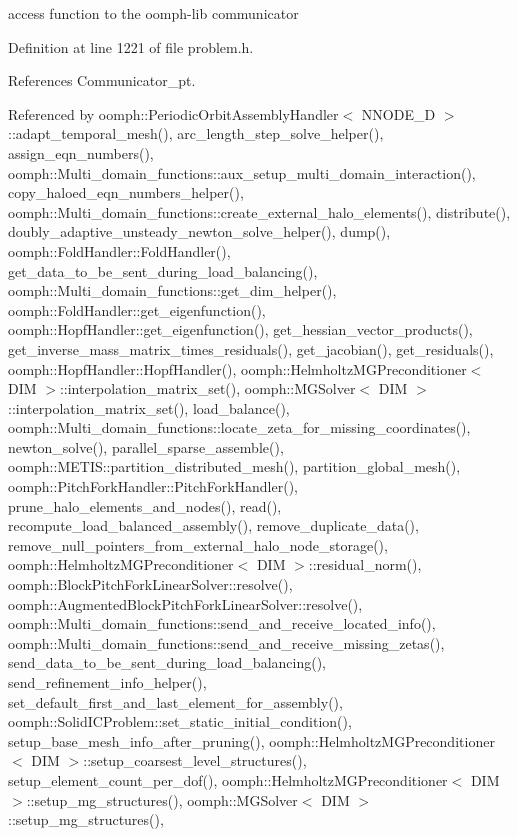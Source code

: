 access function to the oomph-\/lib communicator 



Definition at line 1221 of file problem.\+h.



References Communicator\+\_\+pt.



Referenced by oomph\+::\+Periodic\+Orbit\+Assembly\+Handler$<$ N\+N\+O\+D\+E\+\_\+D $>$\+::adapt\+\_\+temporal\+\_\+mesh(), arc\+\_\+length\+\_\+step\+\_\+solve\+\_\+helper(), assign\+\_\+eqn\+\_\+numbers(), oomph\+::\+Multi\+\_\+domain\+\_\+functions\+::aux\+\_\+setup\+\_\+multi\+\_\+domain\+\_\+interaction(), copy\+\_\+haloed\+\_\+eqn\+\_\+numbers\+\_\+helper(), oomph\+::\+Multi\+\_\+domain\+\_\+functions\+::create\+\_\+external\+\_\+halo\+\_\+elements(), distribute(), doubly\+\_\+adaptive\+\_\+unsteady\+\_\+newton\+\_\+solve\+\_\+helper(), dump(), oomph\+::\+Fold\+Handler\+::\+Fold\+Handler(), get\+\_\+data\+\_\+to\+\_\+be\+\_\+sent\+\_\+during\+\_\+load\+\_\+balancing(), oomph\+::\+Multi\+\_\+domain\+\_\+functions\+::get\+\_\+dim\+\_\+helper(), oomph\+::\+Fold\+Handler\+::get\+\_\+eigenfunction(), oomph\+::\+Hopf\+Handler\+::get\+\_\+eigenfunction(), get\+\_\+hessian\+\_\+vector\+\_\+products(), get\+\_\+inverse\+\_\+mass\+\_\+matrix\+\_\+times\+\_\+residuals(), get\+\_\+jacobian(), get\+\_\+residuals(), oomph\+::\+Hopf\+Handler\+::\+Hopf\+Handler(), oomph\+::\+Helmholtz\+M\+G\+Preconditioner$<$ D\+I\+M $>$\+::interpolation\+\_\+matrix\+\_\+set(), oomph\+::\+M\+G\+Solver$<$ D\+I\+M $>$\+::interpolation\+\_\+matrix\+\_\+set(), load\+\_\+balance(), oomph\+::\+Multi\+\_\+domain\+\_\+functions\+::locate\+\_\+zeta\+\_\+for\+\_\+missing\+\_\+coordinates(), newton\+\_\+solve(), parallel\+\_\+sparse\+\_\+assemble(), oomph\+::\+M\+E\+T\+I\+S\+::partition\+\_\+distributed\+\_\+mesh(), partition\+\_\+global\+\_\+mesh(), oomph\+::\+Pitch\+Fork\+Handler\+::\+Pitch\+Fork\+Handler(), prune\+\_\+halo\+\_\+elements\+\_\+and\+\_\+nodes(), read(), recompute\+\_\+load\+\_\+balanced\+\_\+assembly(), remove\+\_\+duplicate\+\_\+data(), remove\+\_\+null\+\_\+pointers\+\_\+from\+\_\+external\+\_\+halo\+\_\+node\+\_\+storage(), oomph\+::\+Helmholtz\+M\+G\+Preconditioner$<$ D\+I\+M $>$\+::residual\+\_\+norm(), oomph\+::\+Block\+Pitch\+Fork\+Linear\+Solver\+::resolve(), oomph\+::\+Augmented\+Block\+Pitch\+Fork\+Linear\+Solver\+::resolve(), oomph\+::\+Multi\+\_\+domain\+\_\+functions\+::send\+\_\+and\+\_\+receive\+\_\+located\+\_\+info(), oomph\+::\+Multi\+\_\+domain\+\_\+functions\+::send\+\_\+and\+\_\+receive\+\_\+missing\+\_\+zetas(), send\+\_\+data\+\_\+to\+\_\+be\+\_\+sent\+\_\+during\+\_\+load\+\_\+balancing(), send\+\_\+refinement\+\_\+info\+\_\+helper(), set\+\_\+default\+\_\+first\+\_\+and\+\_\+last\+\_\+element\+\_\+for\+\_\+assembly(), oomph\+::\+Solid\+I\+C\+Problem\+::set\+\_\+static\+\_\+initial\+\_\+condition(), setup\+\_\+base\+\_\+mesh\+\_\+info\+\_\+after\+\_\+pruning(), oomph\+::\+Helmholtz\+M\+G\+Preconditioner$<$ D\+I\+M $>$\+::setup\+\_\+coarsest\+\_\+level\+\_\+structures(), setup\+\_\+element\+\_\+count\+\_\+per\+\_\+dof(), oomph\+::\+Helmholtz\+M\+G\+Preconditioner$<$ D\+I\+M $>$\+::setup\+\_\+mg\+\_\+structures(), oomph\+::\+M\+G\+Solver$<$ D\+I\+M $>$\+::setup\+\_\+mg\+\_\+structures(), 